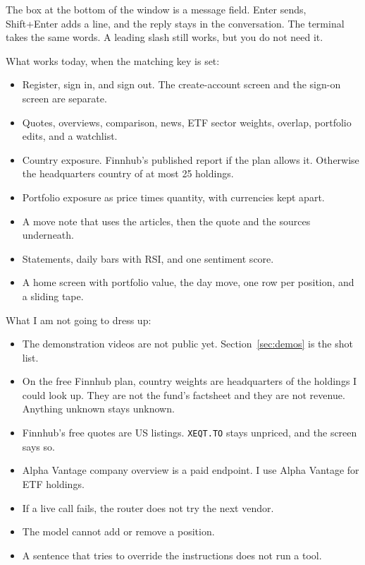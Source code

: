 \documentclass[11pt]{article}
\begin{document}
The box at the bottom of the window is a message field. Enter sends, Shift+Enter adds a line, and the reply stays in the conversation. The terminal takes the same words. A leading slash still works, but you do not need it.

What works today, when the matching key is set:

\begin{itemize}
\item Register, sign in, and sign out. The create-account screen and the sign-on screen are separate.
\item Quotes, overviews, comparison, news, ETF sector weights, overlap, portfolio edits, and a watchlist.
\item Country exposure. Finnhub's published report if the plan allows it. Otherwise the headquarters country of at most 25 holdings.
\item Portfolio exposure as price times quantity, with currencies kept apart.
\item A move note that uses the articles, then the quote and the sources underneath.
\item Statements, daily bars with RSI, and one sentiment score.
\item A home screen with portfolio value, the day move, one row per position, and a sliding tape.
\end{itemize}

What I am not going to dress up:

\begin{itemize}
\item The demonstration videos are not public yet. Section~\ref{sec:demos} is the shot list.
\item On the free Finnhub plan, country weights are headquarters of the holdings I could look up. They are not the fund's factsheet and they are not revenue. Anything unknown stays unknown.
\item Finnhub's free quotes are US listings. \texttt{XEQT.TO} stays unpriced, and the screen says so.
\item Alpha Vantage company overview is a paid endpoint. I use Alpha Vantage for ETF holdings.
\item If a live call fails, the router does not try the next vendor.
\item The model cannot add or remove a position.
\item A sentence that tries to override the instructions does not run a tool.
\end{itemize}
\end{document}
